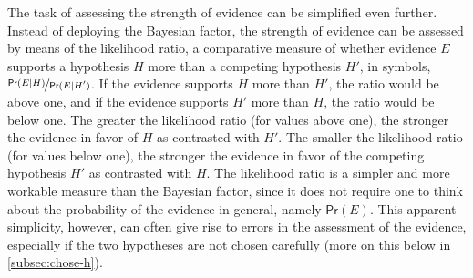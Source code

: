 \documentclass{article}
\newcommand{\pr}{\mathsf{Pr}}
\begin{document}


The task of assessing the strength of evidence can be simplified  even further. Instead of deploying the Bayesian factor, the strength of evidence can be assessed by means of the likelihood ratio, a comparative measure of whether evidence $E$ supports a hypothesis $H$ more than a competing hypothesis $H'$, in symbols, $\nicefrac{\pr(E \vert H)}{\pr(E \vert H')}$. 
If the evidence supports $H$ more than $H'$, the ratio would be above one, and if the evidence supports $H'$ more than $H$, the ratio would be below one.  The greater the likelihood ratio (for values above one), the stronger the evidence in favor of $H$ as contrasted with $H'$. The smaller the likelihood ratio (for values below one), the stronger the evidence in favor of the competing hypothesis $H'$ as contrasted with $H$.  The likelihood ratio is a simpler and more workable measure than the Bayesian factor, since it does not require one to think about the probability of the evidence in general, namely $\pr(E)$. This apparent simplicity, however, can often give rise to errors in the assessment of the evidence, especially if the two hypotheses are not chosen carefully (more on this below in \ref{subsec:chose-h}).
\end{document}
